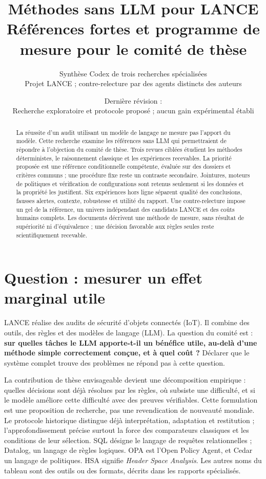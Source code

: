 \documentclass[11pt,a4paper]{article}
\title{Méthodes sans LLM pour LANCE\\
 \large Références fortes et programme de mesure pour le comité de thèse}
\author{Synthèse Codex de trois recherches spécialisées\\
 \small Projet LANCE ; contre-relecture par des agents distincts des auteurs}
\date{Dernière révision : \revision\\[3pt]
 \small Recherche exploratoire et protocole proposé ; aucun gain expérimental établi}
\begin{document}
\maketitle
\begin{abstract}
La réussite d'un audit utilisant un modèle de langage ne mesure pas l'apport
du modèle. Cette recherche examine les références sans LLM qui permettraient
de répondre à l'objection du comité de thèse. Trois revues ciblées étudient les
méthodes déterministes, le raisonnement classique et les expériences recevables.
La priorité proposée est une référence conditionnelle compétente, évaluée sur
des dossiers et critères communs ; une procédure fixe reste un contraste
secondaire. Jointures, moteurs de politiques et vérification de configurations
sont retenus seulement si les données et la propriété les justifient. Six
expériences hors ligne séparent qualité des conclusions, fausses alertes,
contexte, robustesse et utilité du rapport. Une contre-relecture impose un gel
de la référence, un univers indépendant des candidats LANCE et des coûts humains
complets. Les documents décrivent une méthode de mesure, sans résultat de
supériorité ni d'équivalence ; une décision favorable aux règles seules reste
scientifiquement recevable.
\end{abstract}
\tableofcontents
\clearpage

\section{Question : mesurer un effet marginal utile}
LANCE réalise des audits de sécurité d'objets connectés (IoT). Il combine des
outils, des règles et des modèles de langage (LLM). La question du comité est :
\textbf{sur quelles tâches le LLM apporte-t-il un bénéfice utile,
au-delà d'une méthode simple correctement conçue, et à quel coût ?} Déclarer
que le système complet trouve des problèmes ne répond pas à cette question.

La contribution de thèse envisageable devient une décomposition empirique :
quelles décisions sont déjà résolues par les règles, où subsiste une difficulté,
et si le modèle améliore cette difficulté avec des preuves vérifiables. Cette
formulation est une proposition de recherche, pas une revendication de nouveauté
mondiale. Le protocole historique distingue déjà interprétation, adaptation et
restitution \cite{historique} ; l'approfondissement précise surtout la force
des comparateurs classiques et les conditions de leur sélection. SQL désigne
le langage de requêtes relationnelles ; Datalog, un langage de règles logiques.
OPA est l'Open Policy Agent, et Cedar un langage de politiques. HSA signifie
\emph{Header Space Analysis}. Les autres noms du tableau sont des outils ou
des formats, décrits dans les rapports spécialisés.
\end{document}
